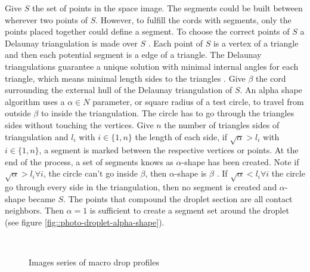 \documentclass[12pt]{iopart}
\begin{document}
                
Give $S$ the set of points in the space image. The segments could 
be built between wherever two points of $S$. However, to fulfill
 the cords with segments, only the points placed together could define
 a segment. To choose the correct points of $S$ a Delaunay triangulation
 is made over $S$ \cite{CGAL}. Each point of $S$ is a vertex
of a triangle and then each potential segment is a edge of a triangle. 
The Delaunay triangulations guarantee a unique solution with minimal
 internal angles for each triangle, which means  minimal
 length sides to the triangles \cite{BERG}.
 Give $\beta$ the cord surrounding the external hull of the Delaunay
 triangulation of $S$. An alpha shape algorithm uses a $\alpha \in N$ parameter,
 or square radius of a test circle, to travel from outside $\beta$ to inside
 the triangulation. The circle has to go through the triangles sides without touching the vertices. Give 
$n$ the number of triangles sides of triangulation
and $l_{i}$ with $i\in\{1,n\}$ the length of each side, if $\sqrt{\alpha} > l_{i}$ 
with $i \in\{1,n\}$, a segment is marked between the respective vertices or
 points. At the end of the process, a  set of segments knows as $\alpha$-shape has been created.
  Note if $\sqrt{\alpha} > l_{i} \forall i$, the circle can't go inside $\beta$, then $\alpha$-shape
 is $\beta$ \cite{CGAL}. If $\sqrt{\alpha} < l_{i} \forall i$ the circle go through
 every side in the triangulation,  then no segment is created and $\alpha$-shape
 became $S$. The points that compound the droplet section are all contact neighbors. Then $\alpha = 1$
 is sufficient to create a segment set around the droplet
 (see figure \ref{fig::photo-droplet-alpha-shape}). 
                                  
\begin{figure}[h!]
\begin{center}    
\\
\end{center}
\caption{{\small Images series of macro drop profiles}}
\label{fig::photo-results-droplet}
\end{figure}
\end{document}
